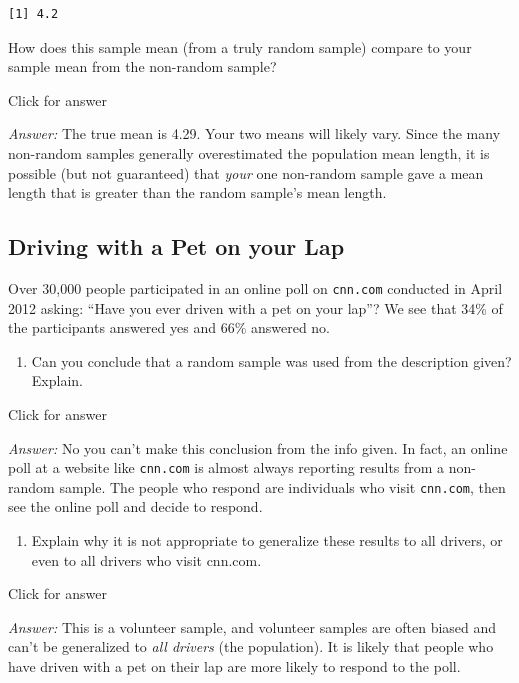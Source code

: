 \documentclass[
]{book}
\providecommand{\tightlist}{%
  \setlength{\itemsep}{0pt}\setlength{\parskip}{0pt}}
\begin{document}
\begin{verbatim}
[1] 4.2
\end{verbatim}

How does this sample mean (from a truly random sample) compare to your sample mean from the non-random sample?

Click for answer

\emph{Answer:} The true mean is 4.29. Your two means will likely vary. Since the many non-random samples generally overestimated the population mean length, it is possible (but not guaranteed) that \emph{your} one non-random sample gave a mean length that is greater than the random sample's mean length.

\hypertarget{driving-with-a-pet-on-your-lap}{%
\subsection{Driving with a Pet on your Lap}\label{driving-with-a-pet-on-your-lap}}

Over 30,000 people participated in an online poll on \texttt{cnn.com} conducted in April 2012 asking: ``Have you ever driven with a pet on your lap''? We see that 34\% of the participants answered yes and 66\% answered no.

\begin{enumerate}
\def\labelenumi{\alph{enumi}.}
\tightlist
\item
  Can you conclude that a random sample was used from the description given? Explain.
\end{enumerate}

Click for answer

\emph{Answer:} No you can't make this conclusion from the info given. In fact, an online poll at a website like \texttt{cnn.com} is almost always reporting results from a non-random sample. The people who respond are individuals who visit \texttt{cnn.com}, then see the online poll and decide to respond.

\begin{enumerate}
\def\labelenumi{\alph{enumi}.}
\setcounter{enumi}{1}
\tightlist
\item
  Explain why it is not appropriate to generalize these results to all drivers, or even to all drivers who visit cnn.com.
\end{enumerate}

Click for answer

\emph{Answer:} This is a volunteer sample, and volunteer samples are often biased and can't be generalized to \emph{all drivers} (the population). It is likely that people who have driven with a pet on their lap are more likely to respond to the poll.
\end{document}
